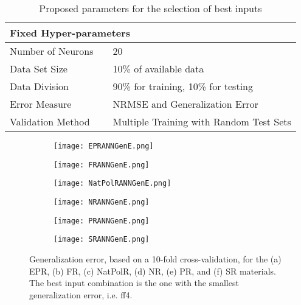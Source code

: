 \begin{table}[htbp!]
    \centering
    \caption{Proposed parameters for the selection of best inputs}
    \begin{tabular}{l m{1cm} l}
    \toprule
    \multicolumn{3}{l}{Fixed Hyper-parameters} \\
    \hline
    Number of Neurons           & & 20 \\
    Data Set Size               & & 10\% of available data\\
    Data Division               & & 90\% for training, 10\% for testing\\
    Error Measure               & & NRMSE and Generalization Error\\
    Validation Method           & & Multiple Training with Random Test Sets\\
    \bottomrule
    \end{tabular}
    \label{tbl:ANN_InputSelParameters}
\end{table}

\begin{figure}[htbp!]
	\centering
    \begin{subfigure}[b]{0.49\textwidth}
        \centering
        \texttt{[image: EPRANNGenE.png]}
        \caption{}
        \label{fig:ANNGenEPR}
    \end{subfigure}
    \begin{subfigure}[b]{0.49\textwidth}
        \centering
        \texttt{[image: FRANNGenE.png]}
        \caption{}
        \label{fig:ANNGenFR}
    \end{subfigure}
    \begin{subfigure}[b]{0.49\textwidth}
        \centering
        \texttt{[image: NatPolRANNGenE.png]}
        \caption{}
        \label{fig:ANNGenNR}
    \end{subfigure}
    \begin{subfigure}[b]{0.49\textwidth}
        \centering
        \texttt{[image: NRANNGenE.png]}
        \caption{}
        \label{fig:ANNGenNatPolR}
    \end{subfigure}
    \begin{subfigure}[b]{0.49\textwidth}
        \centering
        \texttt{[image: PRANNGenE.png]}
        \caption{}
        \label{fig:ANNGenPR}
    \end{subfigure}
    \begin{subfigure}[b]{0.49\textwidth}
        \centering
        \texttt{[image: SRANNGenE.png]}
        \caption{}
        \label{fig:ANNGenSR}
    \end{subfigure}
    \caption{Generalization error, based on a 10-fold cross-validation, for the (a) EPR, (b) FR, (c) NatPolR, (d) NR, (e) PR, and (f) SR materials. The best input combination is the one with the smallest generalization error, i.e. ff4.}
    \label{fig:ANNGen4}
\end{figure}


